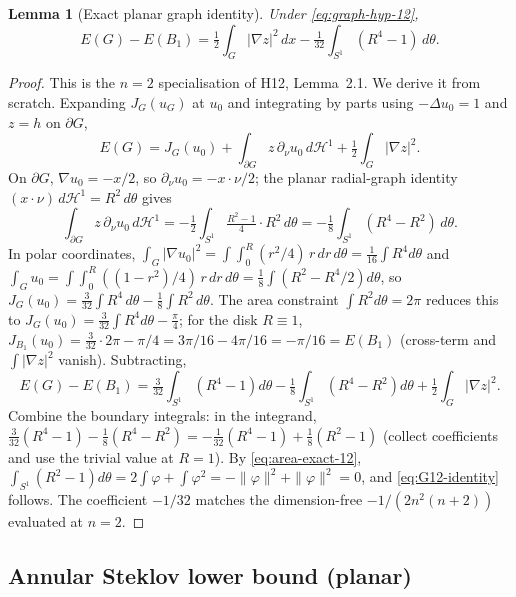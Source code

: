 \documentclass[11pt]{amsart}
\newtheorem{lemma}[theorem]{Lemma}
\begin{document}
\begin{lemma}[Exact planar graph identity]\label{lem:G12-identity}
Under \eqref{eq:graph-hyp-12},
\begin{equation}\label{eq:G12-identity}
   E(G)-E(B_1)
     =\tfrac12\int_G|\nabla z|^2\,dx
       -\tfrac{1}{32}\int_{S^1}(R^4-1)\,d\theta.
\end{equation}
\end{lemma}

\begin{proof}
This is the \(n=2\) specialisation of H12, Lemma~2.1.  We derive it
from scratch.  Expanding \(J_G(u_G)\) at \(u_0\) and integrating by
parts using \(-\Delta u_0=1\) and \(z=h\) on \(\partial G\),
\[
   E(G)=J_G(u_0)
     +\int_{\partial G}z\,\partial_\nu u_0\,d\mathcal H^1
     +\tfrac12\int_G|\nabla z|^2 .
\]
On \(\partial G\), \(\nabla u_0=-x/2\), so
\(\partial_\nu u_0=-x\cdot\nu/2\); the planar radial-graph identity
\((x\cdot\nu)\,d\mathcal H^1=R^2\,d\theta\) gives
\[
   \int_{\partial G}z\,\partial_\nu u_0\,d\mathcal H^1
     =-\tfrac12\int_{S^1}\tfrac{R^2-1}{4}\cdot R^2\,d\theta
     =-\tfrac18\int_{S^1}(R^4-R^2)\,d\theta .
\]
In polar coordinates,
\(\int_G|\nabla u_0|^2=\int\int_0^R(r^2/4)\,r\,dr\,d\theta
=\tfrac{1}{16}\int R^4 d\theta\) and
\(\int_G u_0=\int\int_0^R((1-r^2)/4)\,r\,dr\,d\theta
=\tfrac18\int(R^2-R^4/2)d\theta\), so
\(J_G(u_0)=\tfrac{3}{32}\int R^4\,d\theta
-\tfrac18\int R^2\,d\theta\).  The area constraint
\(\int R^2 d\theta=2\pi\) reduces this to
\(J_G(u_0)=\tfrac{3}{32}\int R^4 d\theta-\tfrac{\pi}{4}\); for the
disk \(R\equiv 1\), \(J_{B_1}(u_0)=\tfrac{3}{32}\cdot 2\pi-\pi/4
=3\pi/16-4\pi/16=-\pi/16=E(B_1)\) (cross-term and \(\int|\nabla z|^2\)
vanish).  Subtracting,
\[
   E(G)-E(B_1)
     =\tfrac{3}{32}\!\int_{S^1}(R^4-1)d\theta
       -\tfrac{1}{8}\!\int_{S^1}(R^4-R^2)d\theta
       +\tfrac12\!\int_G|\nabla z|^2 .
\]
Combine the boundary integrals: in the integrand,
\(\tfrac{3}{32}(R^4-1)-\tfrac{1}{8}(R^4-R^2)
=-\tfrac{1}{32}(R^4-1)+\tfrac{1}{8}(R^2-1)\) (collect coefficients
and use the trivial value at \(R=1\)).  By \eqref{eq:area-exact-12},
\(\int_{S^1}(R^2-1)d\theta=2\int\varphi+\int\varphi^2
=-\|\varphi\|^2+\|\varphi\|^2=0\), and \eqref{eq:G12-identity}
follows.  The coefficient \(-1/32\) matches the dimension-free
\(-1/(2n^2(n+2))\) evaluated at \(n=2\).
\end{proof}

\subsection{Annular Steklov lower bound (planar)}
\label{ss:G12-annular}
\end{document}
